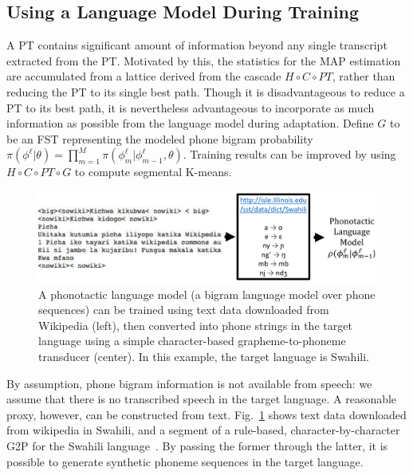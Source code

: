 \subsection{Using a Language Model During Training}
\label{sec:trainwithlm}

A PT contains significant amount of information beyond any single
transcript extracted from the PT. Motivated by this, the statistics
for the MAP estimation are accumulated from a lattice derived from the
cascade $H\circ C \circ PT$, rather than reducing the PT to its single
best path. Though it is disadvantageous to reduce a PT to its best
path, it is nevertheless advantageous to incorporate as much
information as possible from the language model during adaptation.
Define $G$ to be an FST representing the modeled phone bigram
probability
$\pi(\phi^\ell|\theta)=\prod_{m=1}^M\pi(\phi_m^\ell|\phi_{m-1}^\ell,\theta)$.
Training results can be improved by using $H\circ C\circ PT\circ G$ to
compute segmental K-means.

\begin{figure}
  \centerline{\includegraphics[width=5in]{../figs/fig_sloan.png}}
  \caption{A phonotactic language model (a bigram language model over
    phone sequences) can be trained using text data downloaded from
    Wikipedia (left), then converted into phone strings in the target
    language using a simple character-based grapheme-to-phoneme
    transducer (center).  In this example, the target language is
    Swahili.}
  \label{fig:wikitext}
\end{figure}

By assumption, phone bigram information is not available from speech:
we assume that there is no transcribed speech in the target language.
A reasonable proxy, however, can be constructed from text.
Fig.~\ref{fig:wikitext} shows text data downloaded from wikipedia in
Swahili, and a segment of a rule-based, character-by-character G2P for
the Swahili language~\cite{Hasegawajohnson15}.  By passing the former
through the latter, it is possible to generate synthetic phoneme
sequences in the target language.

